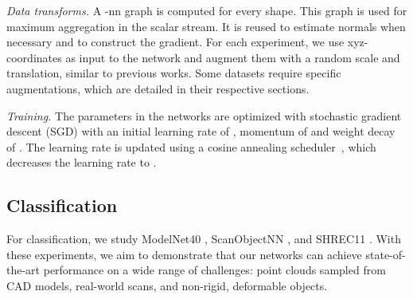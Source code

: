 \documentclass[acmtog, authorversion]{acmart}
\begin{document}
\emph{Data transforms.} A -nn graph is computed for every shape. This graph is used for maximum aggregation in the scalar stream. It is reused to estimate normals when necessary and to construct the gradient. For each experiment, we use xyz-coordinates as input to the network and augment them with a random scale and translation, similar to previous works. Some datasets require specific augmentations, which are detailed in their respective sections.

\emph{Training.} The parameters in the networks are optimized with stochastic gradient descent (SGD) with an initial learning rate of , momentum of  and weight decay of . The learning rate is updated using a cosine annealing scheduler~\cite{cosineannealing2017}, which decreases the learning rate to .

\subsection{Classification}
For classification, we study ModelNet40 \cite{Wu2015}, ScanObjectNN \cite{uy-scanobjectnn-iccv19}, and SHREC11 \cite{lian2011}. With these experiments, we aim to demonstrate that our networks can achieve state-of-the-art performance on a wide range of challenges: point clouds sampled from CAD models, real-world scans, and non-rigid, deformable objects.
\end{document}
